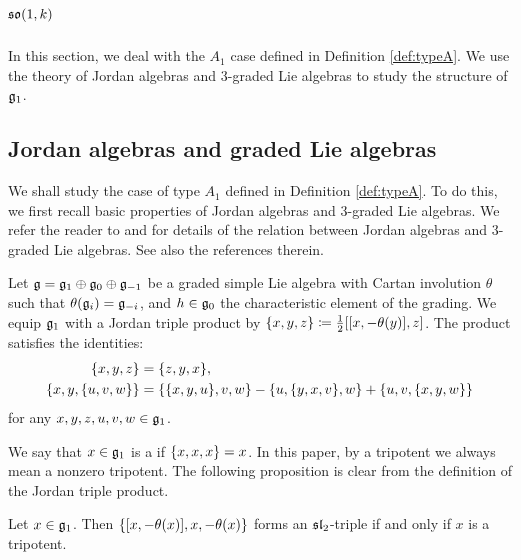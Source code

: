 

\section{\texorpdfstring{$\mathfrak{so}(1, k)$}{so(1,k)}} \label{section:TypeA1}

In this section, we deal with the $A_1$ case defined in Definition \ref{def:typeA}.
We use the theory of Jordan algebras and $3$-graded Lie algebras to study the structure of $\mathfrak{g}_1$.

\subsection{Jordan algebras and graded Lie algebras} \label{subsect:JordanAlgebra}

We shall study the case of type $A_1$ defined in Definition \ref{def:typeA}.
To do this, we first recall basic properties of Jordan algebras and $3$-graded Lie algebras.
We refer the reader to \cite{FaKo94} and \cite{HiKoMo14} for details of the relation between Jordan algebras and $3$-graded Lie algebras.
See also the references therein.

Let $\mathfrak{g} = \mathfrak{g}_1 \oplus \mathfrak{g}_0 \oplus \mathfrak{g}_{-1}$ be a graded simple Lie algebra with Cartan involution $\theta$ such that $\theta(\mathfrak{g}_i) = \mathfrak{g}_{-i}$, and $h \in \mathfrak{g}_0$ the characteristic element of the grading.
We equip $\mathfrak{g}_1$ with a Jordan triple product by $\{x, y, z\} \coloneq \frac{1}{2}[[x, -\theta(y)], z]$.
The product satisfies the identities:
\begin{align*}
	\{x, y, z\} &= \{z, y, x\}, \\
	\{x, y, \{u, v, w\}\} &= \{\{x, y, u\}, v, w\} - \{u, \{y, x, v\}, w\} + \{u, v, \{x, y, w\}\}
\end{align*}
for any $x, y, z, u, v, w \in \mathfrak{g}_1$.

We say that $x \in \mathfrak{g}_1$ is a  if $\{x, x, x\} = x$.
In this paper, by a tripotent we always mean a nonzero tripotent.
The following proposition is clear from the definition of the Jordan triple product.

\begin{proposition} \label{prop:TripotentAndSL2Triple}
	Let $x \in \mathfrak{g}_1$.
	Then $\left\{[x, -\theta(x)], x, -\theta(x) \right\}$ forms an $\mathfrak{sl}_2$-triple if and only if $x$ is a tripotent.
\end{proposition}


